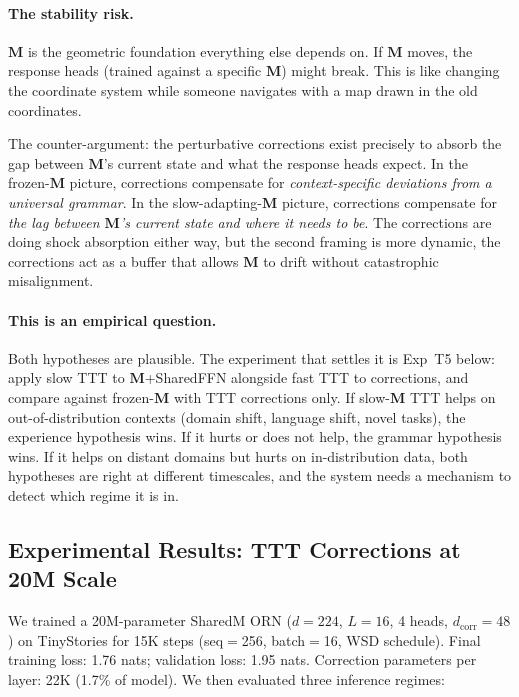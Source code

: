\documentclass[11pt, a4paper]{article}
\newcommand{\M}{\mathbf{M}}
\theoremstyle{plain}
\theoremstyle{definition}
\theoremstyle{remark}
\begin{document}
\paragraph{The stability risk.}
$\M$ is the geometric foundation everything else depends on.
If $\M$ moves, the response heads (trained against a specific $\M$) might break.
This is like changing the coordinate system while someone navigates with a map drawn in the old coordinates.

The counter-argument: the perturbative corrections exist precisely to absorb the gap between $\M$'s current state and what the response heads expect.
In the frozen-$\M$ picture, corrections compensate for \emph{context-specific deviations from a universal grammar}.
In the slow-adapting-$\M$ picture, corrections compensate for \emph{the lag between $\M$'s current state and where it needs to be}.
The corrections are doing shock absorption either way, but the second framing is more dynamic, the corrections act as a buffer that allows $\M$ to drift without catastrophic misalignment.

\paragraph{This is an empirical question.}
Both hypotheses are plausible.
The experiment that settles it is Exp~T5 below: apply slow TTT to $\M$+SharedFFN alongside fast TTT to corrections, and compare against frozen-$\M$ with TTT corrections only.
If slow-$\M$ TTT helps on out-of-distribution contexts (domain shift, language shift, novel tasks), the experience hypothesis wins.
If it hurts or does not help, the grammar hypothesis wins.
If it helps on distant domains but hurts on in-distribution data, both hypotheses are right at different timescales, and the system needs a mechanism to detect which regime it is in.

\subsection{Experimental Results: TTT Corrections at 20M Scale}
\label{sec:ttt-results}

We trained a 20M-parameter SharedM ORN ($d{=}224$, $L{=}16$, 4 heads, $d_{\mathrm{corr}}{=}48$) on TinyStories for 15K steps (seq$=$256, batch$=$16, WSD schedule).
Final training loss: 1.76 nats; validation loss: 1.95 nats.
Correction parameters per layer: 22K (1.7\% of model).
We then evaluated three inference regimes:
\end{document}
